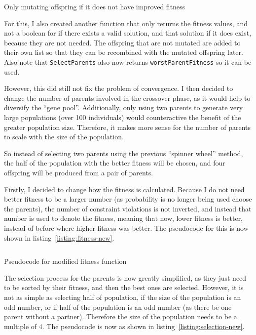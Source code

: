 \begin{listing}[!ht]
	\inputminted[linenos, fontsize=\footnotesize]{text}{code/selective-mutation.txt}
	\caption{Only mutating offspring if it does not have improved fitness}
	\label{listing:selective-mutation}
\end{listing}

For this, I also created another function that only returns the fitness values, 
and not a boolean for if there exists a valid solution, and that solution if it
does exist, because they are not needed.
The offspring that are not mutated are added to their own list so that they can
be recombined with the mutated offspring later.
Also note that \verb|SelectParents| also now returns \verb|worstParentFitness| 
so it can be used.

However, this did still not fix the problem of convergence. 
I then decided to change the number of parents involved in the crossover phase,
as it would help to diversify the ``gene pool''.
Additionally, only using two parents to generate very large populations (over 
100 individuals) would counteractive the benefit of the greater population size.
Therefore, it makes more sense for the number of parents to scale with the size
of the population.

So instead of selecting two parents using the previous ``spinner wheel'' method,
the half of the population with the better fitness will be chosen, and four 
offspring will be produced from a pair of parents.

Firstly, I decided to change how the fitness is calculated.
Because I do not need better fitness to be a larger number (as probability is no
longer being used choose the parents), the number of constraint violations is
not inverted, and instead that number is used to denote the fitness, meaning
that now, lower fitness is better, instead of before where higher fitness was 
better.
The pseudocode for this is now shown in listing~\ref*{listing:fitness-new}.

\begin{listing}[!h]
	\inputminted[linenos, fontsize=\footnotesize]{text}{code/fitness-new.txt}
	\caption{Pseudocode for modified fitness function}
	\label{listing:fitness-new}
\end{listing}

The selection process for the parents is now greatly simplified, as they just
need to be sorted by their fitness, and then the best ones are selected.
However, it is not as simple as selecting half of population, if the size of the
population is an odd number, or if half of the population is an odd number (as 
there be one parent without a partner).
Therefore the size of the population needs to be a multiple of 4.
The pseudocode is now as shown in listing~\ref*{listing:selection-new}.

